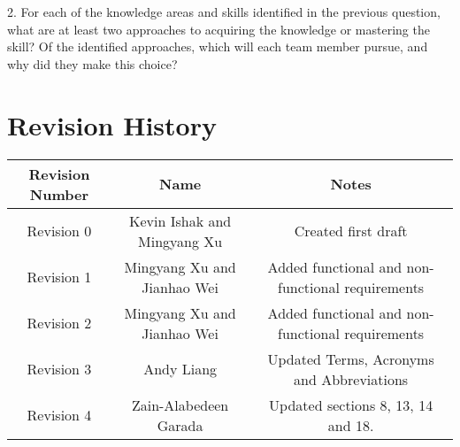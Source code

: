 \documentclass{article}
\begin{document}
2. For each of the knowledge areas and skills identified in the previous question, what are at least two approaches to acquiring the knowledge or mastering the skill? Of the identified approaches, which will each team member pursue, and why did they make this choice?

\section{Revision History}
\begin{tabular}{|c|c|c|}
\hline
\textbf{Revision Number} & \textbf{Name} & \textbf{Notes} \\
\hline
Revision 0 & Kevin Ishak and Mingyang Xu & Created first draft \\
Revision 1 & Mingyang Xu and Jianhao Wei & Added functional and non-functional requirements \\
Revision 2 & Mingyang Xu and Jianhao Wei & Added functional and non-functional requirements \\
Revision 3 & Andy Liang & Updated Terms, Acronyms and Abbreviations \\
Revision 4 & Zain-Alabedeen Garada & Updated sections 8, 13, 14 and 18.\\
\hline
\end{tabular}
\end{document}
